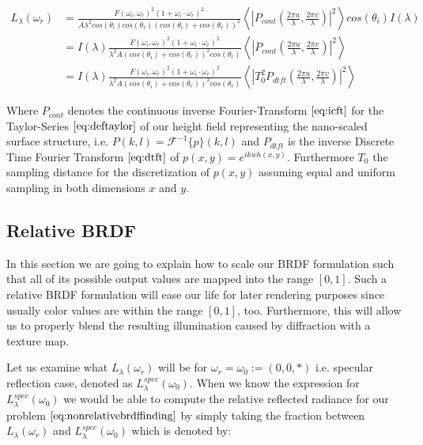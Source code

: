 \begin{align}
L_{\lambda}(\omega_r) 
& = \frac{F(\omega_i, \omega_r)^2 (1 + \omega_i \cdot \omega_r)^2}{A \lambda^2 cos(\theta_i)cos(\theta_r)  (cos(\theta_i)+cos(\theta_r))^2} \left \langle \left|P_{cont}\left( \frac{2\pi u}{\lambda}, \frac{2\pi v}{\lambda}\right) \right|^2 \right \rangle cos(\theta_i) I(\lambda) \nonumber \\
& = I(\lambda) \frac{F(\omega_i, \omega_r)^2 (1 + \omega_i \cdot \omega_r)^2}{\lambda^2 A (cos(\theta_i)+cos(\theta_r))^2 cos(\theta_r)} \left \langle \left|P_{cont}\left( \frac{2\pi u}{\lambda}, \frac{2\pi v}{\lambda}\right) \right|^2 \right \rangle \nonumber \\
& = I(\lambda) \frac{F(\omega_i, \omega_r)^2 (1 + \omega_i \cdot \omega_r)^2}{\lambda^2 A (cos(\theta_i)+cos(\theta_r))^2 cos(\theta_r)} \left \langle \left|T_0^2 P_{dtft}\left( \frac{2\pi u}{\lambda}, \frac{2\pi v}{\lambda}\right) \right|^2 \right \rangle
\label{eq:nonrelativebrdffinding}
\end{align}

Where $P_{cont}$ denotes the continuous inverse Fourier-Transform $\ref{eq:icft}$ for the Taylor-Series $\ref{eq:deftaylor}$ of our height field representing the nano-scaled surface structure, i.e. $P(k,l) = \mathcal{F}^{-1}\{p\}(k,l)$ and $P_{dtft}$ is the inverse Discrete Time Fourier Transform $\ref{eq:dtft}$ of $p(x,y) = e^{ikwh(x,y)}$. Furthermore $T_0$ the sampling distance for the discretization of $p(x,y)$ assuming equal and uniform sampling in both dimensions $x$ and $y$.

\subsection{Relative BRDF}
In this section we are going to explain how to scale our BRDF formulation such that all of its possible output values are mapped into the range $\left[0,1\right]$. Such a relative BRDF formulation will ease our life for later rendering purposes since usually color values are within the range $\left[0,1\right]$, too. Furthermore, this will allow us to properly blend the resulting illumination caused by diffraction with a texture map.

Let us examine what $L_\lambda(\omega_r)$ will be for $\omega_r = \omega_0 := (0,0,*)$ i.e. specular reflection case, denoted as $L_\lambda^{spec}(\omega_0)$. When we know the expression for $L_\lambda^{spec}(\omega_0)$ we would be able to compute the relative reflected radiance for our problem $\ref{eq:nonrelativebrdffinding}$ by simply taking the fraction between $L_\lambda(\omega_r)$ and $L_\lambda^{spec}(\omega_0)$ which is denoted by: 

